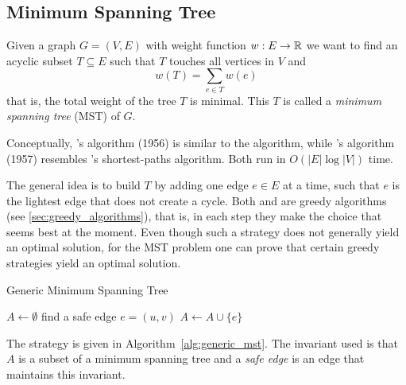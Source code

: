 \subsection{Minimum Spanning Tree}\label{sec:minimum_spanning_tree}

Given a graph \(G=(V,E)\) with weight function \(w:E\to\mathbb{R}\) we want to find an acyclic subset \(T\subseteq E\) such that \(T\) touches all vertices in \(V\) and 
\[
w(T) = \sum_{e\in T} w(e)
\]
that is, the total weight of the tree \(T\) is minimal.
This \(T\) is called a \emph{minimum spanning tree} (MST) of \(G\).

Conceptually, 's algorithm (1956) is similar to the  algorithm, while 's algorithm (1957) resembles 's shortest-paths algorithm.
Both
run in \(O(|E|\log|V|)\) time.

The general idea is to build \(T\) by adding one edge \(e\in E\) at a time, such that \(e\) is the lightest edge that does not create a cycle.
Both  and  are greedy algorithms (see \ref{sec:greedy_algorithms}), that is, in each step they make the choice that seems best at the moment.
Even though such a strategy does not generally yield an optimal solution, for the MST problem one can prove that certain greedy strategies yield an optimal solution.


\begin{algorithm}[h]
\caption{Generic Minimum Spanning Tree}\label{alg:generic_mst}
\begin{algorithmic}[1]
  \State $A\gets\emptyset$ 
   \label{alg:generic_mst:while_start}
    \State find a safe edge \(e=(u,v)\)  \label{alg:generic_mst:safe_edge}
    \State $A\gets A\cup\{e\}$
  \EndWhile \label{alg:generic_mst:while_end}
\EndFunction
\end{algorithmic}
\end{algorithm}
The strategy is given in Algorithm~\ref{alg:generic_mst}. 
The invariant used is that \(A\) is a subset of a minimum spanning tree and a \emph{safe edge} is an edge that maintains this invariant.

